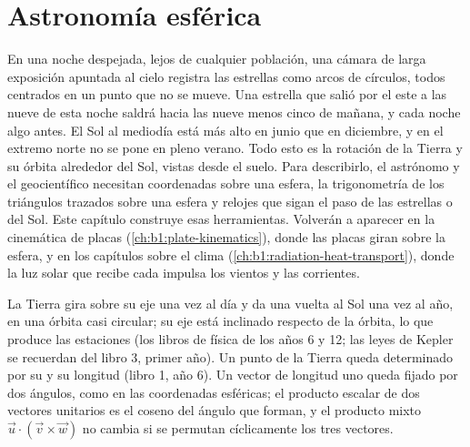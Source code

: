 \chapter{Astronomía esférica}\label{ch:b1:spherical-astronomy}

En una noche despejada, lejos de cualquier población, una cámara de larga
exposición apuntada al cielo registra las estrellas como arcos de círculos,
todos centrados en un punto que no se mueve. Una estrella que salió por el este
a las nueve de esta noche saldrá hacia las nueve menos cinco de mañana, y cada
noche algo antes. El Sol al mediodía está más alto en junio que en diciembre, y
en el extremo norte no se pone en pleno verano. Todo esto es la rotación de la
Tierra y su órbita alrededor del Sol, vistas desde el suelo. Para describirlo,
el astrónomo y el geocientífico necesitan coordenadas sobre una esfera, la
trigonometría de los triángulos trazados sobre una esfera y relojes que sigan
el paso de las estrellas o del Sol. Este capítulo construye esas herramientas.
Volverán a aparecer en la cinemática de placas
(\cref{ch:b1:plate-kinematics}), donde las placas giran sobre la esfera, y en
los capítulos sobre el clima (\cref{ch:b1:radiation-heat-transport}), donde la
luz solar que recibe cada  impulsa los vientos y las corrientes.

\begin{recall}
La Tierra gira sobre su eje una vez al día y da una vuelta al Sol una vez al
año, en una órbita casi circular; su eje está inclinado respecto de la órbita,
lo que produce las estaciones (los libros de física de los años 6 y 12; las
leyes de Kepler se recuerdan del libro 3, primer año). Un punto de la Tierra
queda determinado por su  y su longitud (libro 1, año 6). Un vector de
longitud uno queda fijado por dos ángulos, como en las coordenadas esféricas;
el producto escalar de dos vectores unitarios es el coseno del ángulo que
forman, y el producto mixto $\vec u\cdot(\vec v\times\vec w)$ no cambia si se
permutan cíclicamente los tres vectores.
\end{recall}

